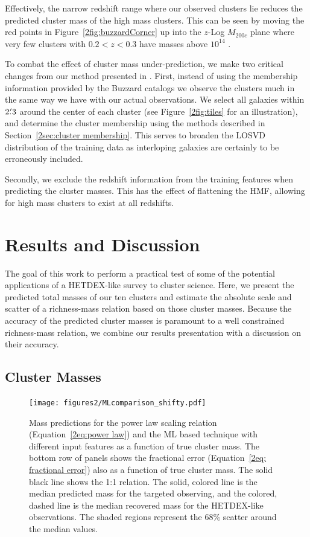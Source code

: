 Effectively, the narrow redshift range where our observed clusters lie reduces the predicted cluster mass of the high mass clusters. This can be seen by moving the red points in Figure~\ref{2fig:buzzardCorner} up into the $z$-Log $M_{200c}$ plane where very few clusters with $0.2< z <0.3$ have masses above $10^{14}$ \Msol.

To combat the effect of cluster mass under-prediction, we make two critical changes from our method presented in . First, instead of using the membership information provided by the Buzzard catalogs we observe the clusters much in the same way we have with our actual observations. We select all galaxies within $2\mbox{\ensuremath{.\mkern-4mu^\prime}}3$ around the center of each cluster (see Figure~\ref{2fig:tiles} for an illustration), and determine the cluster membership using the methods described in Section~\ref{2sec:cluster membership}. This serves to broaden the LOSVD distribution of the training data as interloping galaxies are certainly to be erroneously included.

Secondly, we exclude the redshift information from the training features when predicting the cluster masses. This has the effect of flattening the HMF, allowing for high mass clusters to exist at all redshifts. 

\section{Results and Discussion}\label{2sec:results}
The goal of this work to perform a practical test of some of the potential applications of a HETDEX-like survey to cluster science. Here, we present the predicted total masses of our ten clusters and estimate the absolute scale and scatter of a richness-mass relation based on those cluster masses. Because the accuracy of the predicted cluster masses is paramount to a well constrained richness-mass relation, we combine our results presentation with a discussion on their accuracy. 
 
\subsection{Cluster Masses}
\begin{figure}
	\centering 
	\texttt{[image: figures2/MLcomparison\_shifty.pdf]} 
	\caption{Mass predictions for the power law scaling relation (Equation~\ref{2eq:power law}) and the ML based technique with different input features as a function of true cluster mass. The bottom row of panels shows the fractional error (Equation~\ref{2eq: fractional error}) also as a function of true cluster mass. The solid black line shows the 1:1 relation. The solid, colored line is the median predicted mass for the targeted observing, and the colored, dashed line is the median recovered mass for the HETDEX-like observations. The shaded regions represent the 68\% scatter around the median values.} \label{2fig: ML comparison} 
\end{figure}

